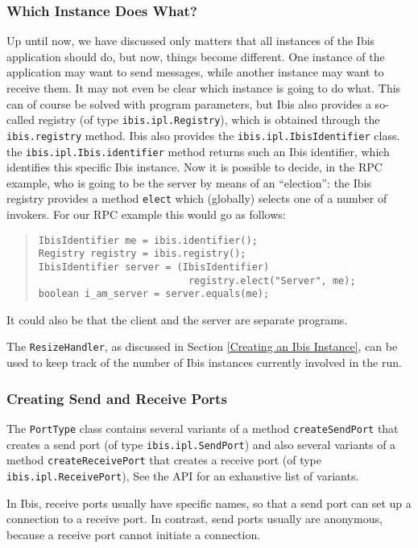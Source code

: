 \documentclass[10pt]{article}
\newcommand{\mysubsubsection}[1]{\subsubsection{#1}\label{#1}}
\begin{document}
\mysubsubsection{Which Instance Does What?}

Up until now, we have discussed only matters that all instances of
the Ibis application should do, but now, things become different.
One instance of the application may want to send messages, while
another instance may want to receive them.
It may not even be clear which instance is going to do what.
This can of course be solved with program parameters, but Ibis
also provides a so-called registry (of type
\verb+ibis.ipl.Registry+), which is obtained through the
\verb+ibis.registry+ method.
Ibis also provides the \verb+ibis.ipl.IbisIdentifier+ class.
the \verb+ibis.ipl.Ibis.identifier+ method returns such an
Ibis identifier, which identifies this specific Ibis instance.
Now it is possible to decide, in the RPC example, who is going
to be the server by means of an ``election'': the Ibis registry
provides a method \verb+elect+ which (globally) selects one of
a number of invokers.
For our RPC example this would go as follows:

\begin{quote}
\begin{verbatim}
IbisIdentifier me = ibis.identifier();
Registry registry = ibis.registry();
IbisIdentifier server = (IbisIdentifier)
                          registry.elect("Server", me);
boolean i_am_server = server.equals(me);
\end{verbatim}
\end{quote}

It could also be that the client and the server are separate programs.

The \verb+ResizeHandler+, as discussed in Section
\ref{Creating an Ibis Instance}, can be used to keep track of the number
of Ibis instances currently involved in the run.

\subsubsection{Creating Send and Receive Ports}

The \verb+PortType+ class contains several variants of a method
\verb+createSendPort+ that creates a send port (of type
\verb+ibis.ipl.SendPort+) and
also several variants of a method \verb+createReceivePort+ that
creates a receive port (of type \verb+ibis.ipl.ReceivePort+),
See the API for an exhaustive list of variants.

In Ibis, receive ports usually have specific names, so that
a send port can set up a connection to a receive port. In contrast,
send ports usually are anonymous, because a receive port cannot
initiate a connection.
\end{document}
